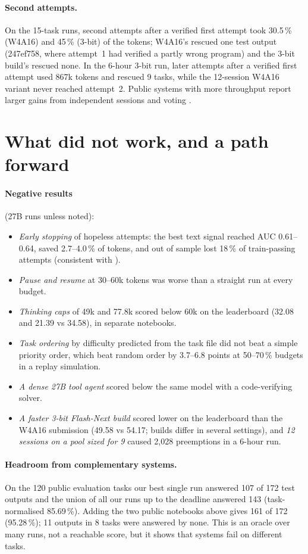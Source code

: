 \documentclass[11pt]{article}
\begin{document}
\paragraph{Second attempts.} On the 15-task runs, second attempts after a verified first attempt took 30.5\,\% (W4A16) and 45\,\% (3-bit) of the tokens; W4A16's rescued one test output (247ef758, where attempt~1 had verified a partly wrong program) and the 3-bit build's rescued none. In the 6-hour 3-bit run, later attempts after a verified first attempt used 867k tokens and rescued 9 tasks, while the 12-session W4A16 variant never reached attempt~2. Public systems with more throughput report larger gains from independent sessions and voting \cite{majkel2026,yichia2026}.

\section{What did not work, and a path forward}\label{sec:progress}
\paragraph{Negative results} (27B runs unless noted):
\begin{itemize}
\item \emph{Early stopping} of hopeless attempts: the best text signal reached AUC 0.61--0.64, saved 2.7--4.0\,\% of tokens, and out of sample lost 18\,\% of train-passing attempts (consistent with \cite{notnitsuj2026}).
\item \emph{Pause and resume} at 30--60k tokens was worse than a straight run at every budget.
\item \emph{Thinking caps} of 49k and 77.8k scored below 60k on the leaderboard (32.08 and 21.39 vs 34.58), in separate notebooks.
\item \emph{Task ordering} by difficulty predicted from the task file did not beat a simple priority order, which beat random order by 3.7--6.8 points at 50--70\,\% budgets in a replay simulation.
\item \emph{A dense 27B tool agent} scored below the same model with a code-verifying solver.
\item \emph{A faster 3-bit Flash-Next build} scored lower on the leaderboard than the W4A16 submission (49.58 vs 54.17; builds differ in several settings), and \emph{12 sessions on a pool sized for 9} caused 2{,}028 preemptions in a 6-hour run.
\end{itemize}

\paragraph{Headroom from complementary systems.} On the 120 public evaluation tasks our best single run answered 107 of 172 test outputs and the union of all our runs up to the deadline answered 143 (task-normalised 85.69\,\%). Adding the two public notebooks above gives 161 of 172 (95.28\,\%); 11 outputs in 8 tasks were answered by none. This is an oracle over many runs, not a reachable score, but it shows that systems fail on different tasks.
\end{document}
